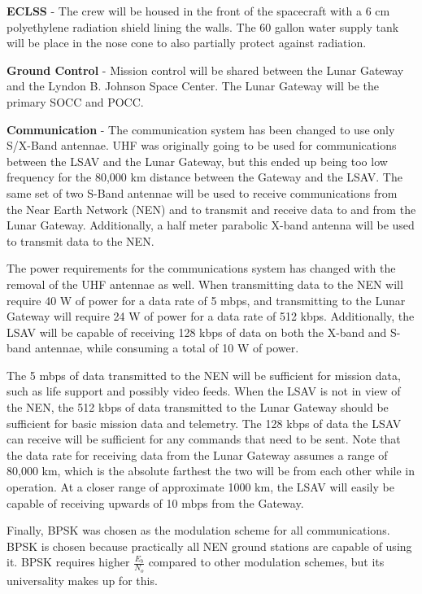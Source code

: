 \documentclass[10pt]{article}
\begin{document}
\textbf{ECLSS} - The crew will be housed in the front of the spacecraft with a 6
cm polyethylene radiation shield lining the walls. The 60 gallon water
supply tank will be place in the nose cone to also partially protect
against radiation.

\textbf{Ground Control} - Mission control will be shared between the Lunar
Gateway and the Lyndon B. Johnson Space Center. The Lunar Gateway will
be the primary SOCC and POCC.

\textbf{Communication} - The communication system has been changed to use only
S/X-Band antennae. UHF was originally going to be used for
communications between the LSAV and the Lunar Gateway, but this ended
up being too low frequency for the 80,000 km distance between the
Gateway and the LSAV. The same set of two S-Band antennae will be used
to receive communications from the Near Earth Network (NEN) and to
transmit and receive data to and from the Lunar Gateway. Additionally,
a half meter parabolic X-band antenna will be used to transmit data to
the NEN.

The power requirements for the communications system has changed with
the removal of the UHF antennae as well. When transmitting data to the
NEN will require 40 W of power for a data rate of 5 mbps, and
transmitting to the Lunar Gateway will require 24 W of power for a
data rate of 512 kbps. Additionally, the LSAV will be capable of
receiving 128 kbps of data on both the X-band and S-band antennae,
while consuming a total of 10 W of power.

The 5 mbps of data transmitted to the NEN will be sufficient for
mission data, such as life support and possibly video feeds. When the
LSAV is not in view of the NEN, the 512 kbps of data transmitted to
the Lunar Gateway should be sufficient for basic mission data and
telemetry. The 128 kbps of data the LSAV can receive will be
sufficient for any commands that need to be sent. Note that the data
rate for receiving data from the Lunar Gateway assumes a range of
80,000 km, which is the absolute farthest the two will be from each
other while in operation. At a closer range of approximate 1000 km,
the LSAV will easily be capable of receiving upwards of 10 mbps from
the Gateway.

Finally, BPSK was chosen as the modulation scheme for all
communications. BPSK is chosen because practically all NEN ground
stations are capable of using it. BPSK requires higher \(\frac{E_b}{N_o}\)
compared to other modulation schemes, but its universality makes up
for this.
\end{document}
